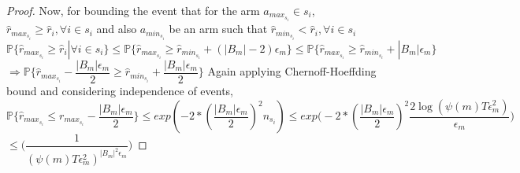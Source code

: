 \begin{proof}
\newline Now, for bounding the event that for the arm $a_{max_{s_{i}}}\in s_{i}$, $\hat{r}_{max_{s_{i}}}\geq \hat{r}_{i}, \forall i\in s_{i}$ and also $a_{min_{s_{i}}}$ be an arm such that $\hat{r}_{min_{s_{i}}}< \hat{r}_{i}, \forall i\in s_{i}$
\newline
$\mathbb{P}\lbrace\hat{r}_{max_{s_{i}}}\geq \hat{r}_{i}|\forall i\in s_{i}\rbrace\leq \mathbb{P}\lbrace\hat{r}_{max_{s_{i}}}\geq \hat{r}_{min_{s_{i}}}+(|B_{m}|-2)\epsilon_{m}\rbrace\leq \mathbb{P}\lbrace\hat{r}_{max_{s_{i}}} \geq \hat{r}_{min_{s_{i}}}+|B_{m}|\epsilon_{m}\rbrace$
\newline
$\Rightarrow \mathbb{P}\lbrace \hat{r}_{max_{s_{i}}} - \dfrac{|B_{m}|\epsilon_{m}}{2} \geq \hat{r}_{min_{s_{i}}}+\dfrac{|B_{m}|\epsilon_{m}}{2} \rbrace$
\newline
Again applying Chernoff-Hoeffding bound and considering independence of events,
\newline
$\mathbb{P}\lbrace\hat{r}_{max_{s_{i}}}\leq r_{max_{s_{i}}} - \dfrac{|B_{m}|\epsilon_{m}}{2}\rbrace\leq exp(-2*(\dfrac{|B_{m}|\epsilon_{m}}{2})^{2}n_{s_{i}})\leq exp\bigg(-2*(\dfrac{|B_{m}|\epsilon_{m}}{2})^{2}\dfrac{2\log{(\psi(m)T\epsilon_{m}^{2})}}{\epsilon_{m}}\bigg)$
\newline\hspace*{21em}$\leq \bigg(\dfrac{1}{(\psi(m)T\epsilon_{m}^{2})^{|B_{m}|^{2}\epsilon_{m}}}\bigg)$

\end{proof}
